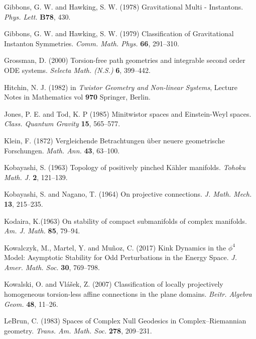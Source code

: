 \begin{thebibliography}{}
Gibbons, G. W. and Hawking, S. W. (1978)
Gravitational Multi - Instantons.
\textit{Phys. Lett.} \textbf{B78},
430.

 Gibbons, G. W. and Hawking, S. W. (1979) Classification of Gravitational Instanton Symmetries.
\textit{Comm. Math. Phys.} {\bf 66}, 291--310.




 Grossman, D. (2000) Torsion-free path geometries and integrable second order ODE systems. \textit{Selecta
Math. (N.S.)} {\bf 6}, 399--442.

 Hitchin, N. J. (1982) in {\em Twistor Geometry and Non-linear Systems}, Lecture Notes in Mathematics vol {\bf 970} Springer, Berlin.

Jones, P. E. and  Tod, K. P (1985)
Minitwistor spaces and Einstein-Weyl spaces. 
\textit{Class. Quantum Gravity} {\bf 15}, 565--577.

 Klein, F. (1872)
Vergleichende Betrachtungen \"uber neuere geometrische Forschungen. \textit{Math. Ann.} {\bf 43}, 63--100.



Kobayashi, S. (1963)
Topology of positively pinched K\"ahler manifolds.
\textit{Tohoku Math. J.} {\bf 2}, 121--139.

 Kobayashi, S. and Nagano, T. (1964)
On projective connections. \textit{J. Math. Mech.} {\bf 13}, 215--235.

 Kodaira, K.(1963)
On stability of compact submanifolds of complex manifolds.
\textit{Am. J. Math.} {\bf 85}, 79--94.

 Kowalczyk, M., Martel, Y. and Mu\~noz, C. (2017)
Kink Dynamics in the $\phi^4$ Model: Asymptotic Stability for Odd Perturbations in the Energy Space. \textit{J. Amer. Math. Soc.} {\bf 30}, 769--798.

 Kowalski, O. and Vl\' a\v sek, Z. (2007)
Classification of locally projectively homogeneous torsion-less affine connections in the plane domains. \textit{Beitr. Algebra Geom.} {\bf 48}, 11--26.

 LeBrun, C. (1983)
Spaces of Complex Null Geodesics in Complex--Riemannian geometry. \textit{Trans. Am. Math. Soc.} {\bf 278}, 209--231.


\end{thebibliography}
